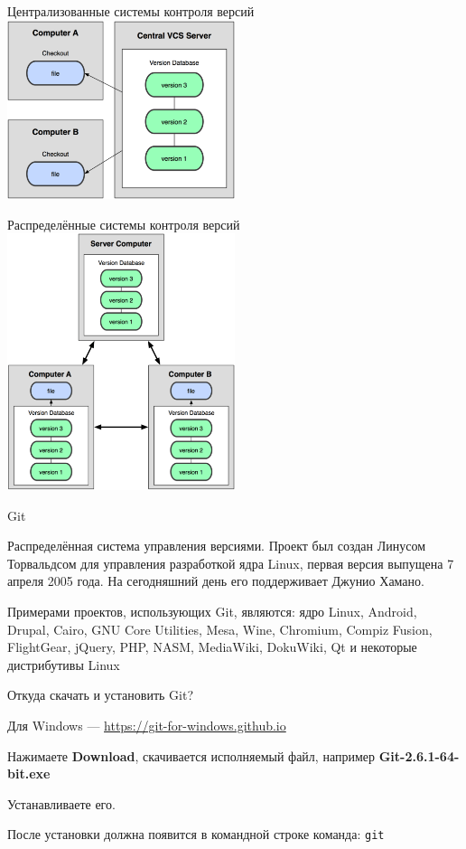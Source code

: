\begin{frame}[t]{Централизованные системы контроля версий}
\includegraphics[width=0.5\textwidth]{git/central.png}
\end{frame}

\begin{frame}[t]{Распределённые системы контроля версий}
\includegraphics[width=0.5\textwidth]{git/distrib.png}
\end{frame}

\begin{frame}[t]{Git}

Распределённая система управления версиями. 
Проект был создан Линусом Торвальдсом для управления разработкой ядра Linux, первая версия выпущена 7 апреля 2005 года. 
На сегодняшний день его поддерживает Джунио Хамано.

Примерами проектов, использующих Git, являются:
ядро Linux, Android, Drupal, Cairo, GNU Core Utilities, Mesa, Wine, Chromium, Compiz Fusion, FlightGear, jQuery, PHP, NASM, MediaWiki, DokuWiki, Qt и некоторые дистрибутивы Linux 

\url{}

\end{frame}

\begin{frame}[t]{Откуда скачать и установить Git?}


Для Windows --- \url{https://git-for-windows.github.io}

Нажимаете \textbf{Download}, скачивается исполняемый файл, например 
\textbf{Git-2.6.1-64-bit.exe}

Устанавливаете его. 

После установки должна появится в командной строке команда:
\texttt{git}

\end{frame}

